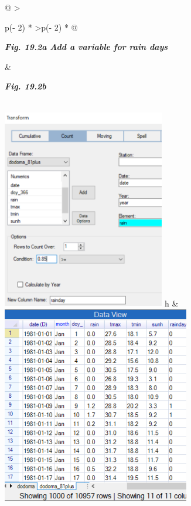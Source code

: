 \documentclass[
  letterpaper,
  DIV=11,
  numbers=noendperiod]{scrreprt}
\begin{document}
\begin{longtable}[]{@{}
  >{\raggedright\arraybackslash}p{(\columnwidth - 2\tabcolsep) * }
  >{\centering\arraybackslash}p{(\columnwidth - 2\tabcolsep) * }@{}}
\toprule\noalign{}
\begin{minipage}[b]{\linewidth}\raggedright
\textbf{\emph{Fig. 19.2a Add a variable for rain days}}
\end{minipage} & \begin{minipage}[b]{\linewidth}\centering
\textbf{\emph{Fig. 19.2b}}
\end{minipage} \\
\midrule\noalign{}
\endhead
\bottomrule\noalign{}
\endlastfoot
\includegraphics[width=2.7959in,height=3.43268in]{figures/Fig19.2a.png}
h &
\includegraphics[width=3.22887in,height=\textheight]{figures/Fig19.2b.png} \\
\end{longtable}
\end{document}
